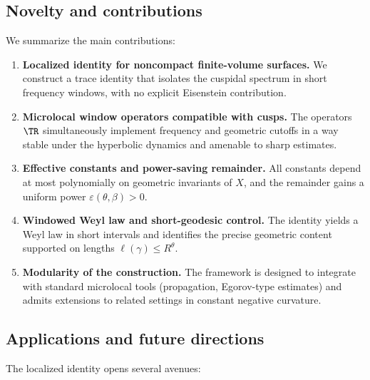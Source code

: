 \subsection{Novelty and contributions}

We summarize the main contributions:

\begin{enumerate}
  \item \textbf{Localized identity for noncompact finite-volume surfaces.} We construct a trace identity that isolates the cuspidal spectrum in short frequency windows, with no explicit Eisenstein contribution.
  \item \textbf{Microlocal window operators compatible with cusps.} The operators $\TR$ simultaneously implement frequency and geometric cutoffs in a way stable under the hyperbolic dynamics and amenable to sharp estimates.
  \item \textbf{Effective constants and power-saving remainder.} All constants depend at most polynomially on geometric invariants of $X$, and the remainder gains a uniform power $\varepsilon(\theta,\beta)>0$.
  \item \textbf{Windowed Weyl law and short-geodesic control.} The identity yields a Weyl law in short intervals and identifies the precise geometric content supported on lengths $\ell(\gamma)\le R^\theta$.
  \item \textbf{Modularity of the construction.} The framework is designed to integrate with standard microlocal tools (propagation, Egorov-type estimates) and admits extensions to related settings in constant negative curvature.
\end{enumerate}

\subsection{Applications and future directions}

The localized identity opens several avenues:

